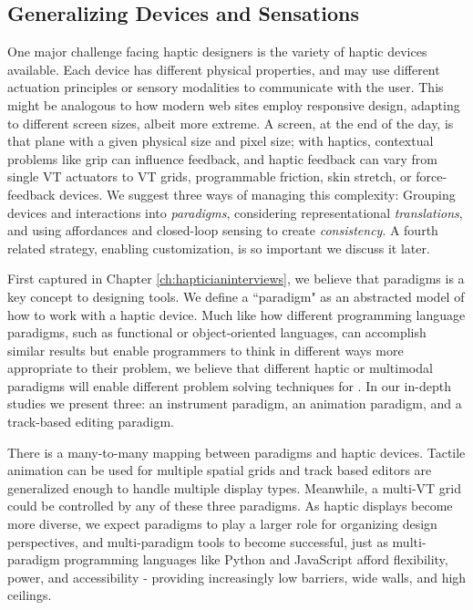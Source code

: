 \subsection{Generalizing Devices and Sensations}
One major challenge facing haptic designers is the variety of haptic devices available.
Each device has different physical properties, and may use different actuation principles or sensory modalities to communicate with the user.
This might be analogous to how modern web sites employ responsive design, adapting to different screen sizes, albeit more extreme.
A screen, at the end of the day, is that plane with a given physical size and pixel size; with haptics,
contextual problems like grip can influence feedback, and haptic feedback can vary from single VT actuators to VT grids, programmable friction, skin stretch, or force-feedback devices.
We suggest three ways of managing this complexity:
Grouping devices and interactions into \emph{paradigms},
considering representational \emph{translations}, and
using affordances and closed-loop sensing to create \emph{consistency}.
A fourth related strategy, enabling customization, is so important we discuss it later.


First captured in Chapter \ref{ch:hapticianinterviews}, we believe that paradigms is a key concept to designing \haxd tools.
We define a ``paradigm" as an abstracted model of how to work with a haptic device.
Much like how different programming language paradigms, such as functional or object-oriented languages, can accomplish similar results but enable programmers to think in different ways more appropriate to their problem, we believe that different haptic or multimodal paradigms will enable different problem solving techniques for \haxd.
In our in-depth studies we present three: an instrument paradigm, an animation paradigm, and a track-based editing paradigm.

There is a many-to-many mapping between paradigms and haptic devices.
Tactile animation can be used for multiple spatial grids and track based editors are generalized enough to handle multiple display types.
Meanwhile, a multi-VT grid could be controlled by any of these three paradigms.
As haptic displays become more diverse, we expect paradigms to play a larger role for organizing design perspectives, and multi-paradigm tools to become successful, just as multi-paradigm programming languages like Python and JavaScript afford flexibility, power, and accessibility - providing increasingly low barriers, wide walls, and high ceilings.


